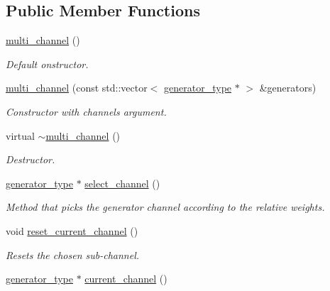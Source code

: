\subsection*{Public Member Functions}
\begin{DoxyCompactItemize}
\item 
\hypertarget{a00379_a64cfde48e4782eefef698991bfaa3156}{}\hyperlink{a00379_a64cfde48e4782eefef698991bfaa3156}{multi\+\_\+channel} ()\label{a00379_a64cfde48e4782eefef698991bfaa3156}

\begin{DoxyCompactList}\small\item\em Default onstructor. \end{DoxyCompactList}\item 
\hypertarget{a00379_a583ec1106e2de9cc092050826f3a1b96}{}\hyperlink{a00379_a583ec1106e2de9cc092050826f3a1b96}{multi\+\_\+channel} (const std\+::vector$<$ \hyperlink{a00366}{generator\+\_\+type} $\ast$ $>$ \&generators)\label{a00379_a583ec1106e2de9cc092050826f3a1b96}

\begin{DoxyCompactList}\small\item\em Constructor with channels argument. \end{DoxyCompactList}\item 
\hypertarget{a00379_a09ab4a65050348712ea6de233a5a0dcb}{}virtual \hyperlink{a00379_a09ab4a65050348712ea6de233a5a0dcb}{$\sim$multi\+\_\+channel} ()\label{a00379_a09ab4a65050348712ea6de233a5a0dcb}

\begin{DoxyCompactList}\small\item\em Destructor. \end{DoxyCompactList}\item 
\hyperlink{a00366}{generator\+\_\+type} $\ast$ \hyperlink{a00379_a32132c51c31d9e8e3a80d2c2d8988b35}{select\+\_\+channel} ()
\begin{DoxyCompactList}\small\item\em Method that picks the generator channel according to the relative weights. \end{DoxyCompactList}\item 
\hypertarget{a00379_a2e49aeeb30314a910779e5bdefd38453}{}void \hyperlink{a00379_a2e49aeeb30314a910779e5bdefd38453}{reset\+\_\+current\+\_\+channel} ()\label{a00379_a2e49aeeb30314a910779e5bdefd38453}

\begin{DoxyCompactList}\small\item\em Resets the chosen sub-\/channel. \end{DoxyCompactList}\item 
\hypertarget{a00379_a814e48a31b082dcf59ee3161c192fc3f}{}\hyperlink{a00366}{generator\+\_\+type} $\ast$ \hyperlink{a00379_a814e48a31b082dcf59ee3161c192fc3f}{current\+\_\+channel} ()\label{a00379_a814e48a31b082dcf59ee3161c192fc3f}


\end{DoxyCompactItemize}
